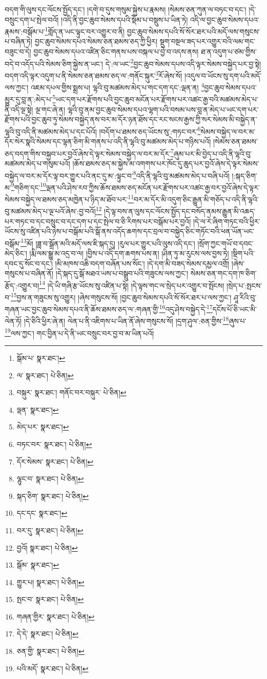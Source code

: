 བདག་གི་ལུས་དང་ལོངས་སྤྱོད་དང་། །དགེ་བ་དུས་གསུམ་སྐྱེས་པ་རྣམས། །སེམས་ཅན་ཀུན་ལ་བཏང་བ་དང་། །དེ་བསྲུང་དག་པ་སྤེལ་བའོ། །འདི་ནི་བྱང་ཆུབ་སེམས་དཔའི་སྡོམ་པ་བསྡུས་པ་ཡིན་ཏེ། འདི་ལ་བྱང་ཆུབ་སེམས་དཔའ་རྣམས་:བསྒོམ་པ་\footnote{སྒོམ་པ་  སྣར་ཐང་། }གློད་ན་ཡང་ལྟུང་བར་འགྱུར་བ་ནི། བྱང་ཆུབ་སེམས་དཔའི་སོ་སོར་ཐར་པའི་མདོ་ལས་གསུངས་པ་བཞིན་ཏེ། བྱང་ཆུབ་སེམས་དཔའ་སེམས་ཅན་ཐམས་ཅད་ཀྱི་ཕྱིར། སྡུག་བསྔལ་ཟད་པར་འགྱུར་བའི་ལམ་གང་བཟུང་བ་དེ། བྱང་ཆུབ་སེམས་དཔའ་འཛིན་ཅིང་གནས་པས་བསྐལ་པ་བྱེ་བ་འདས་ནས། ཐ་ན་འདུག་པ་ཙམ་གྱིས་བདེ་བ་འདོད་པའི་སེམས་ཅིག་སྐྱེས་ན་ཡང་། དེ་:ལ་ཡང་\footnote{ལ་  སྣར་ཐང་།  པེ་ཅིན། }བྱང་ཆུབ་སེམས་དཔས་འདི་ལྟར་སེམས་བསྐྱེད་པར་བྱ་སྟེ། བདག་འདི་ལྟར་འདུག་པ་ནི་སེམས་ཅན་ཐམས་ཅད་ལ་:གནོང་སྐུར་\footnote{བསྐུར་  སྣར་ཐང་། གནོང་བར་བསྐུར་  པེ་ཅིན། }རོ་ཞེས་སོ། །འདུལ་བ་ཡོངས་སུ་དག་པའི་མདོ་ལས་ཀྱང་། འཇམ་དཔལ་གྱིས་སྨྲས་པ། ལྷའི་བུ་མཚམས་མེད་པ་གང་དག་དང་:ལྡན་ན། \footnote{ལྡན་  སྣར་ཐང་། }བྱང་ཆུབ་སེམས་དཔའ་མྱུར་དུ་བླ་ན་:མེད་པ་\footnote{མེད་པར་  སྣར་ཐང་། }ཡང་དག་པར་རྫོགས་པའི་བྱང་ཆུབ་མངོན་པར་རྫོགས་པར་འཚང་རྒྱ་བའི་མཚམས་མེད་པ་ནི་འདི་ལྔ་སྟེ། ལྔ་གང་ཞེ་ན། ལྷའི་བུ་ནམ་བྱང་ཆུབ་སེམས་དཔའ་ལྷག་པའི་བསམ་པས་བླ་ན་མེད་པ་ཡང་དག་པར་རྫོགས་པའི་བྱང་ཆུབ་ཏུ་སེམས་བསྐྱེད་ནས་བར་མ་དོར་ཉན་ཐོས་དང་རང་སངས་རྒྱས་ཀྱི་སར་སེམས་མི་བསྐྱེད་ན་ལྷའི་བུ་འདི་ནི་མཚམས་མེད་པ་དང་པོའོ། །བདོག་པ་ཐམས་ཅད་ཡོངས་སུ་:གཏང་བར་\footnote{བཏང་བར་  སྣར་ཐང་།  པེ་ཅིན། }སེམས་བསྐྱེད་ལ་བར་མ་དོར་སེར་སྣའི་སེམས་དང་ལྷན་ཅིག་མི་གནས་པ་འདི་ནི་ལྷའི་བུ་མཚམས་མེད་པ་གཉིས་པའོ། །སེམས་ཅན་ཐམས་ཅད་བདག་གིས་བསྐྱབ་པར་བྱའོ་ཞེས་དེ་ལྟར་སེམས་བསྐྱེད་ལ་བར་མ་དོར་\footnote{དོར་སེམས་  སྣར་ཐང་།  པེ་ཅིན། }ཞུམ་པར་མི་བྱེད་པ་འདི་ནི་ལྷའི་བུ་མཚམས་མེད་པ་གསུམ་པའོ། །ཆོས་ཐམས་ཅད་མ་སྐྱེས་མ་འགགས་པར་ཁོང་དུ་ཆུད་པར་བྱའོ་ཞེས་དེ་ལྟར་སེམས་བསྐྱེད་ལ་བར་མ་དོར་ལྟ་བར་གྱུར་པའི་ནང་དུ་མ་:ལྟུང་བ་\footnote{ལྷུང་བ་  སྣར་ཐང་།  པེ་ཅིན། }འདི་ནི་ལྷའི་བུ་མཚམས་མེད་པ་བཞི་པའོ། །:སྐད་ཅིག་མ་\footnote{སྐད་ཅིག་  སྣར་ཐང་།  པེ་ཅིན། }གཅིག་དང་\footnote{དང་དང་  སྣར་ཐང་། }ལྡན་པའི་ཤེས་རབ་ཀྱིས་ཆོས་ཐམས་ཅད་མངོན་པར་རྫོགས་པར་འཚང་རྒྱ་བར་བྱའོ་ཞེས་དེ་ལྟར་སེམས་བསྐྱེད་ལ་ཐམས་ཅད་མཁྱེན་པ་ཉིད་མ་ཐོབ་པར་\footnote{བར་དུ་  སྣར་ཐང་།  པེ་ཅིན། }བར་མ་དོར་མི་འདུག་ཅིང་རྒྱུན་མི་གཅོད་པ་འདི་ནི་ལྷའི་བུ་མཚམས་མེད་པ་ལྔ་པའོ་ཞེས་:བྱ་བའོ།\footnote{བྱའོ།  སྣར་ཐང་།  པེ་ཅིན། } །དེ་ལྟ་བས་ན་ལུས་དང་ལོངས་སྤྱོད་དང་བསོད་ནམས་རྒྱུན་མི་འཆད་པར་གཏང་བ་དང་བསྲུང་བ་དང་དག་པ་དང་སྤེལ་བ་ཅི་རིགས་པར་བསྒོམ་པར་བྱའོ། །དེ་ལ་རེ་ཞིག་གཏང་བའི་ཕྱིར་ཡོངས་སུ་འཛིན་པའི་ཉེས་པ་བསྒོམ་པའི་སྒོ་ནས་འདོད་ཆགས་དང་བྲལ་བ་བསྐྱེད་ཅིང་གཏོང་བའི་ཕན་ཡོན་ཡང་བསྒོམ་\footnote{སྒོམ་  སྣར་ཐང་། }མོ། །ཟླ་བ་སྒྲོན་མའི་མདོ་ལས་ཇི་སྐད་དུ། །རུལ་པར་གྱུར་པའི་ལུས་འདི་དང་། །སྲོག་ཀྱང་གཡོ་བ་དབང་མེད་ཅིང་། །རྨི་ལམ་སྒྱུ་མ་འདྲ་བ་ལ། །བྱིས་པ་འདི་དག་ཆགས་པས་ན། །ཤིན་ཏུ་མ་རུངས་ལས་བྱས་ཏེ། །སྡིག་པའི་དབང་དུ་སོང་བ་དང་། །མི་མཁས་འཆི་བདག་བཞོན་པས་སོང་། །དེ་དག་མི་བཟད་སེམས་དམྱལ་འགྲོ། །ཞེས་གསུངས་པ་བཞིན་ནོ། །དེ་སྐད་དུ་སྒོ་མཐའ་ཡས་པ་བསྒྲུབ་པའི་གཟུངས་ལས་ཀྱང་། སེམས་ཅན་གང་དག་ཁ་ཅིག་རྩོད་:འགྱུར་བ།\footnote{གྱུར་པ།  སྣར་ཐང་།  པེ་ཅིན། } །དེ་ཡི་གཞི་རྩ་ཡོངས་སུ་འཛིན་པ་སྟེ། །དེ་ལྟས་གང་ལ་སྲེད་པར་འགྱུར་བ་སྤོངས། །སྲེད་པ་:སྤངས་བ་\footnote{སྤང་བ་  སྣར་ཐང་།  པེ་ཅིན། }བྱས་ན་གཟུངས་སུ་འགྱུར། །ཞེས་གསུངས་སོ། །བྱང་ཆུབ་སེམས་དཔའི་སོ་སོར་ཐར་པ་ལས་ཀྱང་། ཤཱ་རིའི་བུ་གཞན་ཡང་བྱང་ཆུབ་སེམས་དཔའ་ནི་ཆོས་ཐམས་ཅད་ལ་:གཞན་གྱི་\footnote{གཞན་གྱིར་  སྣར་ཐང་།  པེ་ཅིན། }འདུ་ཤེས་བསྐྱེད་དེ་\footnote{དེ་དེ་  སྣར་ཐང་།  པེ་ཅིན། }དངོས་པོ་ཅི་ཡང་མི་ལེན་ཏོ། །དེ་ཅིའི་ཕྱིར་ཞེ་ན། ལེན་པ་ནི་འཇིགས་པ་ཡིན་ནོ་ཞེས་གསུངས་སོ། །དྲག་ཤུལ་:ཅན་གྱིས་\footnote{ཅན་གྱི་  སྣར་ཐང་།  པེ་ཅིན། }ཞུས་པ་\footnote{པའི་མདོ་  སྣར་ཐང་།  པེ་ཅིན། }ལས་ཀྱང་། གང་བྱིན་པ་དེ་ནི་ཡང་བསྲུང་བར་བྱ་བ་མ་ཡིན་པའོ། 